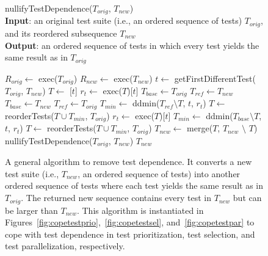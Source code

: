 \begin{figure}[t!]
    \vspace{-3mm}
	nullifyTestDependence($\mathit{T_{orig}}$, $\mathit{T_{new}}$)\\
	\textbf{Input}: an original test suite (i.e., an ordered sequence of
    tests) $\mathit{T_{orig}}$, and its
    reordered subsequence $\mathit{T_{new}}$\\
	\textbf{Output}: an ordered sequence of tests in which every test
    yields the same result as in $\mathit{T_{orig}}$\\
	 \begin{algorithmic}[1]
	 	\vspace{-5mm}
        \STATE $\mathit{R_{orig}} \leftarrow$ exec($\mathit{T_{orig}}$)
        \STATE $\mathit{R_{new}} \leftarrow$ exec($\mathit{T_{new}}$)
        \STATE $\mathit{t} \leftarrow$ getFirstDifferentTest($\mathit{T_{orig}}$, $\mathit{T_{new}}$)
        \STATE $\mathit{T} \leftarrow$ [$\mathit{t}$] 
        \STATE $\mathit{r_t} \leftarrow$ exec($\mathit{T}$)[$\mathit{t}$]
        \STATE $\mathit{T_{base}} \leftarrow T_{orig}$
        \STATE $\mathit{T_{ref}} \leftarrow T_{new}$
          \STATE $\mathit{T_{base}} \leftarrow T_{new}$
          \STATE $\mathit{T_{ref}} \leftarrow T_{orig}$
        \ENDIF
        \STATE $\mathit{T_{min}} \leftarrow$ ddmin($\mathit{T_{ref}} \setminus \mathit{T}$, $\mathit{t}$, $\mathit{r_t}$)
        \STATE $\mathit{T} \leftarrow$ reorderTests($\mathit{T} \cup \mathit{T_{min}}$, $\mathit{T_{orig}}$)
        \STATE $\mathit{r_t} \leftarrow$ exec($\mathit{T}$)[$\mathit{t}$]
        \STATE $\mathit{T_{min}} \leftarrow$ ddmin($\mathit{T_{base}} \setminus \mathit{T}$, $\mathit{t}$, $\mathit{r_t}$)
        \STATE $\mathit{T} \leftarrow$ reorderTests($\mathit{T} \cup \mathit{T_{min}}$, $\mathit{T_{orig}}$)
        \ENDIF
        \STATE $\mathit{T_{new}} \leftarrow$ merge($\mathit{T}$, $\mathit{T_{new}}$ $\setminus$ $\mathit{T}$)
        \RETURN nullifyTestDependence($\mathit{T_{orig}}$, $\mathit{T_{new}}$)
        \ENDIF
        \RETURN $\mathit{T_{new}}$
	\end{algorithmic}
	\vspace{-3mm}
	\caption {
        A general algorithm to remove test dependence. It converts
        a new test suite (i.e., $\mathit{T_{new}}$, an ordered sequence of tests)
        into another ordered sequence of tests where each test yields
        the same result as in $\mathit{T_{orig}}$. The returned new
        sequence contains every test in $\mathit{T_{new}}$ but can be
        larger than $\mathit{T_{new}}$. This algorithm is instantiated
        in Figures~\ref{fig:copetestprio},~\ref{fig:copetestsel},
        and~\ref{fig:copetestpar} to cope with test dependence in test prioritization,
        test selection, and test parallelization, respectively.
	}
	\label{fig:basealgorithm}
\end{figure}

